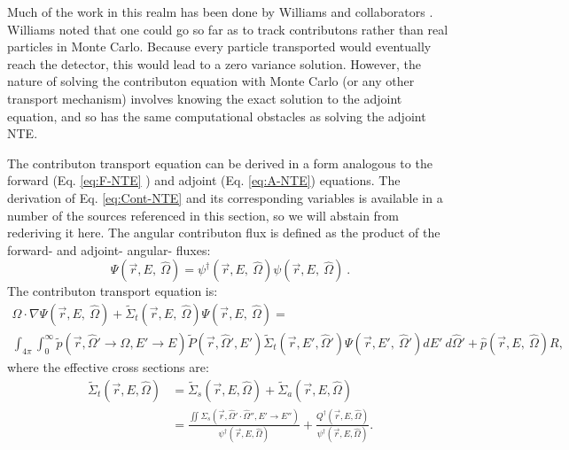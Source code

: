 Much of the work in this realm has been done
by Williams and collaborators
\cite{williams_generalized_1991,williams_contributorn_1992,williams_contributon_study}.
Williams noted that one could
go so far as to track contributons rather than real particles in Monte Carlo.
Because every particle transported would eventually reach the detector, this
would lead to a zero variance solution. However, the nature of solving the
contributon equation with Monte Carlo (or any other transport mechanism)
involves knowing the exact solution to the adjoint equation, and so has
the same computational obstacles as solving the adjoint NTE.

The contributon transport equation can be derived in a form analogous
to the forward (Eq. \ref{eq:F-NTE} ) and adjoint (Eq. \ref{eq:A-NTE}) equations.
The derivation of Eq. \ref{eq:Cont-NTE} and its corresponding variables is
available in a number of the sources referenced in this section, so we will
abstain from rederiving it here.
The angular contributon flux is defined
as the product of the forward- and
adjoint- angular- fluxes:
\begin{equation}
\Psi (\vec {r} ,E,\:\hat\Omega) = \psi^{\dagger} (\vec {r} ,E,\:\hat\Omega)
        \psi(\vec {r} ,E,\:\hat\Omega)\:.
\label{eq.Cont-Flux}
\end{equation}
The contributon transport equation is:
\begin{multline}
\hat\Omega \cdot \nabla \Psi (\vec {r} ,E,\:\hat\Omega)
+\widetilde{\Sigma} _{ t }(\vec{r},E,\:\hat\Omega)\Psi (\vec { r } ,E,\:\hat\Omega)
     = \\
        \int _{ 4\pi  } \int _{ 0 }^{ \infty  }
        \widetilde{p}(\vec{r}, \hat\Omega'\rightarrow\hat\Omega, E'\rightarrow E)
        \widetilde{P}(\vec{r}, \hat\Omega',E')
        \widetilde{\Sigma} _{ t }(\vec{r}, E', \hat\Omega')
        \Psi (\vec { r } ,E',\: \hat\Omega')dE' \:d\hat\Omega'
        + \hat p(\vec { r } ,E, \:\hat\Omega) R ,
\label{eq:Cont-NTE}
\end{multline}
where the effective cross sections are:
\begin{equation}
\begin{aligned}
\widetilde{\Sigma}_{t}(\vec{r}, E, \hat\Omega) &=
        \widetilde{\Sigma}_{s}(\vec{r}, E, \hat\Omega) +
        \widetilde{\Sigma}_{a}(\vec{r}, E, \hat\Omega)    \\
     &= \frac{\iint \Sigma_{s}(\vec{r},\hat\Omega'\cdot\hat\Omega'',
        E'\rightarrow E'')}{\psi^{\dagger}(\vec{r}, E, \hat\Omega)}
        + \frac{Q^{\dagger}(\vec{r}, E, \hat\Omega)}
        {\psi^{\dagger}(\vec{r}, E, \hat\Omega)}.
\end{aligned}
\end{equation}
